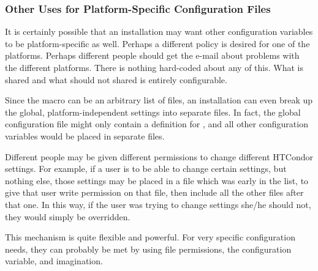 \subsubsection{\label{sec:Other-Uses-for-Platform-Files}Other Uses for
Platform-Specific Configuration Files} 

It is certainly possible that an installation may want other 
configuration variables to be platform-specific as well.
Perhaps a different policy is desired for
one of the platforms.
Perhaps different people should get the
e-mail about problems with the different platforms.
There is nothing hard-coded about any of this.
What is shared and
what should not shared is entirely configurable.

Since the  macro can be an arbitrary
list of files, an installation can even break up the global,
platform-independent settings into separate files.
In fact, the global configuration file might
only contain a definition for , and all
other configuration variables would be placed in separate files.  

Different people may be given different permissions to change different
HTCondor settings.  For example, if a user is to be able to
change certain settings, but nothing else, those
settings may be placed in a file which was early
in the  list,
to give that user write permission on that file, then include all
the other files after that one.  In this way, if the user was trying to
change settings she/he should not, they would simply be overridden.  

This mechanism is quite flexible and powerful.  For
very specific configuration needs, they can probably be met by
using file permissions, the  configuration
variable, and imagination.


